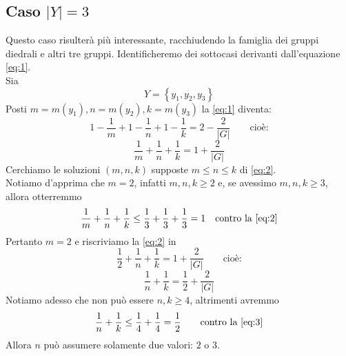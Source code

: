 \subsection{Caso $\left|Y\right|=3$}
Questo caso risulter\`a pi\`u interessante, racchiudendo la famiglia dei gruppi diedrali e altri tre gruppi.
Identificheremo dei sottocasi derivanti dall'equazione \ref{eq:1}.\\
Sia
\begin{equation*}
Y=\left\{y_1,y_2,y_3\right\}
\end{equation*}
Posti $m=m(y_1), n=m(y_2), k=m(y_3)$ la \ref{eq:1} diventa:
\begin{equation*}
1-\frac{1}{m}+1-\frac{1}{n}+1-\frac{1}{k}=2-\frac{2}{\left|G\right|}\qquad\text{cio\`e:}
\end{equation*}
\begin{equation} \label{eq:2}
\frac{1}{m}+\frac{1}{n}+\frac{1}{k}=1+\frac{2}{\left|G\right|}
\end{equation}
Cerchiamo le soluzioni $(m,n,k)$ supposte $m\leq n\leq k$ di \ref{eq:2}.\\
Notiamo d'apprima che $m=2$, infatti $m,n,k\geq 2$ e, se avessimo $m,n,k\geq 3$, allora otterremmo
\begin{equation*}
\frac{1}{m}+\frac{1}{n}+\frac{1}{k}\leq\frac{1}{3}+\frac{1}{3}+\frac{1}{3}=1\quad\text{contro la \ref{eq:2}}
\end{equation*}
Pertanto $m=2$ e riscriviamo la \ref{eq:2} in
\begin{equation*}
\frac{1}{2}+\frac{1}{n}+\frac{1}{k}=1+\frac{2}{\left|G\right|}\qquad\text{cio\`e:}
\end{equation*}
\begin{equation} \label{eq:3}
\frac{1}{n}+\frac{1}{k}=\frac{1}{2}+\frac{2}{\left|G\right|}
\end{equation}
Notiamo adesso che non pu\`o essere $n,k\geq 4$, altrimenti avremmo
\begin{equation*}
\frac{1}{n}+\frac{1}{k}\leq\frac{1}{4}+\frac{1}{4}=\frac{1}{2}\qquad\text{contro la \ref{eq:3}}
\end{equation*}
Allora $n$ pu\`o assumere solamente due valori: $2$ o $3$.

